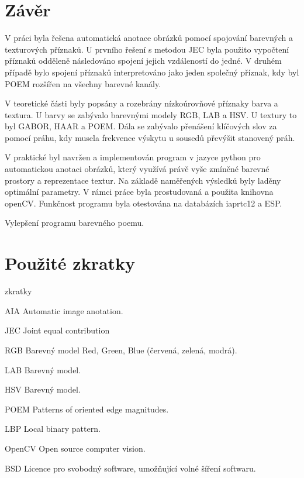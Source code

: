 \documentclass[czech,BP]{thesiskiv}
\begin{document}
\chapter{Závěr}
\par V práci byla řešena automatická anotace obrázků pomocí spojování barevných a texturových příznaků. U prvního řešení s metodou JEC byla použito vypočtení příznaků odděleně následováno spojení jejich vzdáleností do jedné.  V druhém případě bylo spojení příznaků interpretováno jako jeden společný příznak, kdy byl POEM rozšířen na všechny barevné kanály.
\par V teoretické části byly popsány a rozebrány nízkoúrovňové příznaky barva a textura. U barvy se zabývalo barevnými modely RGB, LAB a HSV. U textury to byl GABOR, HAAR a POEM. Dála se zabývalo přenášení klíčových slov za pomocí práhu, kdy musela frekvence výskytu u sousedů převýšit stanovený práh. 
\par V praktické byl navržen a implementován program v jazyce python pro automatickou anotaci obrázků, který využívá právě vyše zmíněné barevné prostory a reprezentace textur. Na základě naměřených výsledků byly laděny optimální parametry. V rámci práce byla prostudovaná a použita knihovna openCV. Funkčnost programu byla otestována na databázích iaprtc12 a ESP.
\par Vylepšení programu barevného poemu. 

 
 
% 
%

\chapter{Použité zkratky}


\begin{labeling}{zkratky}
	\item [AIA] Automatic image anotation.	
	\item [JEC] Joint equal contribution
	\item [RGB] Barevný model Red, Green, Blue (červená, zelená, modrá).
	\item [LAB] Barevný model. 
	\item [HSV] Barevný model. 
	\item [POEM] Patterns of oriented edge magnitudes.
	\item [LBP] Local binary pattern.
	\item [OpenCV] Open source computer vision.
	\item [BSD] Licence pro svobodný software, umožňující volné šíření softwaru.
\end{labeling}
\end{document}
